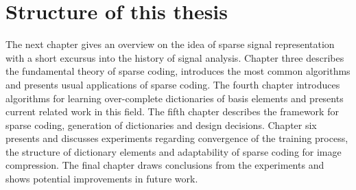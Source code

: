 % 
% 
% 
% 
% 






\section{Structure of this thesis}
The next chapter gives an overview on the idea of sparse signal
representation with a short excursus into the history of signal analysis.
Chapter three describes the fundamental theory of sparse coding, introduces
the
most common algorithms and presents usual applications of sparse coding. The
fourth chapter introduces algorithms for learning over-complete
dictionaries of basis elements and presents current related work in this
field.
The fifth chapter describes the framework for sparse coding, generation
of dictionaries and design decisions. Chapter six presents and discusses
experiments regarding convergence of the training process, the structure of
dictionary elements and adaptability of sparse coding for image
compression. 
The final chapter draws conclusions from the experiments and shows potential
improvements in future work. 


